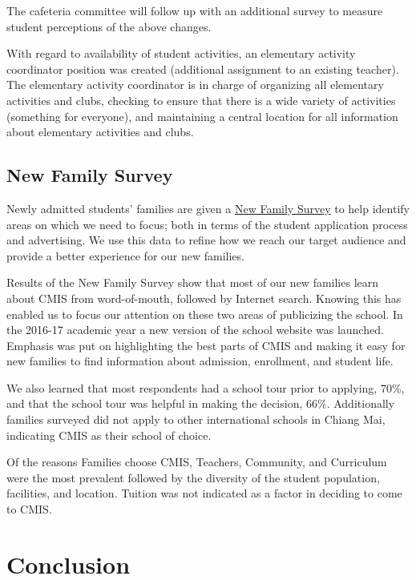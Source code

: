 The cafeteria committee will follow up with an additional survey to measure student perceptions of the above changes.

With regard to availability of student activities, an elementary activity coordinator position was created (additional assignment to an existing teacher).  The elementary activity coordinator is in charge of organizing all elementary activities and clubs, checking to ensure that there is a wide variety of activities (something for everyone), and maintaining a central location for all information about elementary activities and clubs.

\subsection{New Family Survey}

Newly admitted students’ families are given a \href{https://docs.google.com/a/cmis.ac.th/forms/d/1basukpCBjcCMWXDh-cUUWW6lgk6zxYadGMn1EzFDQwc/viewanalytics}{New Family Survey} to help identify areas on which we need to focus; both in terms of the student application process and advertising. We use this data to refine how we reach our target audience and provide a better experience for our new families.


Results of the New Family Survey show that most of our new families learn about CMIS from word-of-mouth, followed by Internet search. Knowing this has enabled us to focus our attention on these two areas of publicizing the school. In the 2016-17 academic year a new version of the school website was launched. Emphasis was put on highlighting the best parts of CMIS and making it easy for new families to find information about admission, enrollment, and student life.


We also learned that most respondents had a school tour prior to applying, 70\%, and that the school tour was helpful in making the decision, 66\%. Additionally families surveyed did not apply to other international schools in Chiang Mai, indicating CMIS as their school of choice.

Of the reasons Families choose CMIS, Teachers, Community, and Curriculum were the most prevalent followed by the diversity of the student population, facilities, and location. Tuition was not indicated as a factor in deciding to come to CMIS.

\section{Conclusion}

